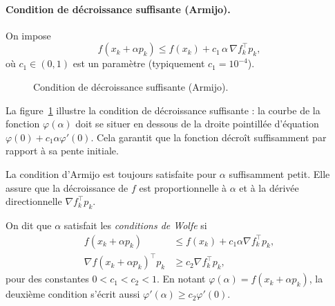 \paragraph{Condition de décroissance suffisante (Armijo).}

On impose
\begin{equation}
\label{eq:Armijo}
    f(x_k + \alpha p_k)
    \le f(x_k) + c_1\,\alpha\,\nabla f_k^\top p_k,
\end{equation}
où $c_1 \in (0,1)$ est un paramètre (typiquement $c_1 = 10^{-4}$).

\begin{figure}[H]
\centering
{}
\caption{Condition de décroissance suffisante (Armijo).}
\label{fig:armijo}
\end{figure}

\begin{figureexplanation}
La figure~\ref{fig:armijo} illustre la condition de décroissance suffisante : la courbe de la fonction $\varphi(\alpha)$ doit se situer en dessous de la droite pointillée d'équation $\varphi(0) + c_1 \alpha \varphi'(0)$. Cela garantit que la fonction décroît suffisamment par rapport à sa pente initiale.
\end{figureexplanation}

\begin{remarque}
La condition d’Armijo est toujours satisfaite pour $\alpha$ suffisamment petit.
Elle assure que la décroissance de $f$ est proportionnelle à $\alpha$ et à la
dérivée directionnelle $\nabla f_k^\top p_k$.
\end{remarque}



\begin{definition}
On dit que $\alpha$ satisfait les \emph{conditions de Wolfe} si
\begin{align}
    f(x_k + \alpha p_k)
    &\le f(x_k) + c_1 \alpha \nabla f_k^\top p_k, \\
    \nabla f(x_k + \alpha p_k)^\top p_k
    &\ge c_2 \nabla f_k^\top p_k,
\end{align}
pour des constantes $0 < c_1 < c_2 < 1$.
En notant $\varphi(\alpha) = f(x_k + \alpha p_k)$, la deuxième condition
s’écrit aussi $\varphi'(\alpha) \ge c_2 \varphi'(0)$.
\end{definition}

